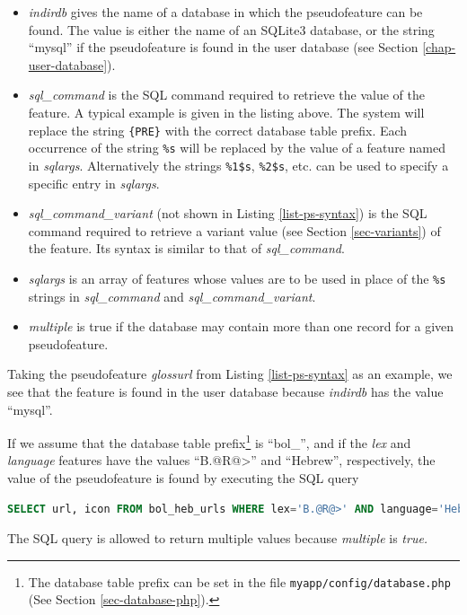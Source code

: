 \documentclass[11pt,oneside,a4paper]{memoir}
\begin{document}
\begin{itemize}
\item \emph{indirdb} gives the name of a database in which the pseudofeature can be found. The value
  is either the name of an SQLite3 database, or the string ``mysql'' if the
  pseudofeature is found in the user database (see Section
  \ref{chap-user-database}).
\item \emph{sql\_command} is the SQL command required to retrieve the value of the feature. A
  typical example is given in the listing above. The system will replace the string \texttt{\{PRE\}}
  with the correct database table prefix. Each occurrence of the string \texttt{\%s} will be
  replaced by the value of a feature named in \emph{sqlargs}. Alternatively the strings
  \texttt{\%1\$s}, \texttt{\%2\$s}, etc. can be used to specify a specific entry in \emph{sqlargs}.
\item \emph{sql\_command\_variant} (not shown in Listing \ref{list-ps-syntax}) is the SQL command
  required to retrieve a variant value (see Section \ref{sec-variants}) of the feature. Its syntax is
  similar to that of \emph{sql\_command}.
\item \emph{sqlargs} is an array of features whose values are to be used in place of the
  \texttt{\%s} strings in \emph{sql\_command} and \emph{sql\_command\_variant}.
\item \emph{multiple} is true if the database may contain more than one record for a given pseudofeature.
\end{itemize}

Taking the pseudofeature \emph{glossurl} from Listing \ref{list-ps-syntax} as an example, we see that
the feature is found in the user database because \emph{indirdb} has the value ``mysql''.

If we assume that the database table prefix\footnote{The database table prefix can be set in the
  file \texttt{myapp/config/database.php} (See Section \ref{sec-database-php}).} is ``bol\_'', and
if the \emph{lex} and \emph{language} features have the values ``B.@R@>'' and ``Hebrew'', respectively,
the value of the pseudofeature is found by executing the SQL query

\begin{lstlisting}[language=SQL]
SELECT url, icon FROM bol_heb_urls WHERE lex='B.@R@>' AND language='Hebrew'
\end{lstlisting}

The SQL query is allowed to return multiple values because \emph{multiple} is \emph{true.}
\end{document}
